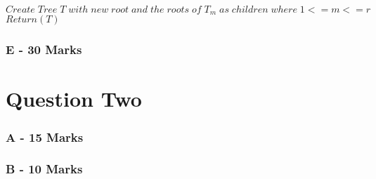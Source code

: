 \documentclass[paper=a4, fontsize=11pt]{scrartcl}
\newcommand\tab[1][1cm]{\hspace*{#1}}
\numberwithin{equation}{section}		%
\numberwithin{figure}{section}			%
\numberwithin{table}{section}				%
\begin{document}
\noindent
\tab$Create\;Tree\;T\;with\;new\;root\;and\;the\;roots\;of\;T_m\;as\;children\;where\;1<=m<=r$\\


\noindent
\tab$Return(T)$\\

\subsubsection*{E - 30 Marks}

\iffalse
Reverse the Build algorithm, i,e. design an algorithm that takes a tree with labelled leaves
as an input, and produces a set of constraints of the form (i, j) < (k, l), such that when
Build runs on that set, the result is (an isomorphic copy of) the input tree. Prove the
correctness of your algorithm. Also, a smaller output (number of constraints) would give
you a better mark. 
\fi


\section*{Question Two}

\iffalse
This question is about the MinCutSupertree algorithm from  C. Semple and M. Steel. A supertree method for rooted trees. Discrete Applied Mathematics
\fi

\subsubsection*{A - 15 Marks}

\iffalse
One of its properties is that it preserves nesting and subtrees that are shared
by all of the input trees. Point where precisely in the algorithm this property
is achieved.
\fi

\subsubsection*{B - 10 Marks}

\iffalse
Argue that the MinCutSupertree algorithm is a generalisation of the Build
algorithm, i.e. show how to encode a constraint from the inputs of the later as
a tree, which is one of the inputs of the former.
\fi

\end{document}
